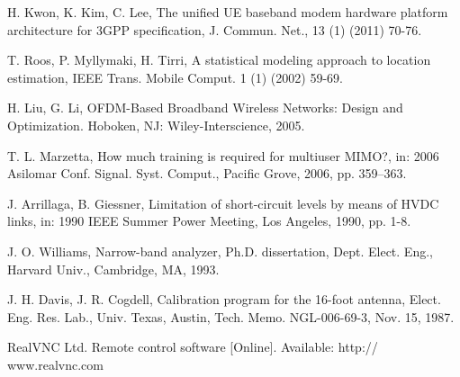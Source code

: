 \documentclass[final,3p,times,twocolumn]{elsarticle}
\begin{document}
\begin{thebibliography}{1}

 H. Kwon, K. Kim, C. Lee, The unified UE baseband modem hardware platform architecture for 3GPP specification, J. Commun. Net., 13 (1) (2011) 70-76.

 T. Roos, P. Myllymaki, H. Tirri, A statistical modeling approach to location estimation, IEEE Trans. Mobile Comput. 1 (1) (2002) 59-69.

 H. Liu, G. Li, OFDM-Based Broadband Wireless Networks: Design and Optimization. Hoboken, NJ: Wiley-Interscience, 2005.

 T. L. Marzetta, How much training is required for multiuser MIMO?, in: 2006 Asilomar Conf. Signal. Syst. Comput., Pacific Grove, 2006, pp. 359–363.

 J. Arrillaga, B. Giessner, Limitation of short-circuit levels by means of HVDC links, in: 1990 IEEE Summer Power Meeting, Los Angeles, 1990, pp. 1-8.

 J. O. Williams, Narrow-band analyzer, Ph.D. dissertation, Dept. Elect. Eng., Harvard Univ., Cambridge, MA, 1993.

 J. H. Davis, J. R. Cogdell, Calibration program for the 16-foot antenna, Elect. Eng. Res. Lab., Univ. Texas, Austin, Tech. Memo. NGL-006-69-3, Nov. 15, 1987.

 RealVNC Ltd. Remote control software [Online]. Available: http:// www.realvnc.com


\end{thebibliography}
\end{document}
